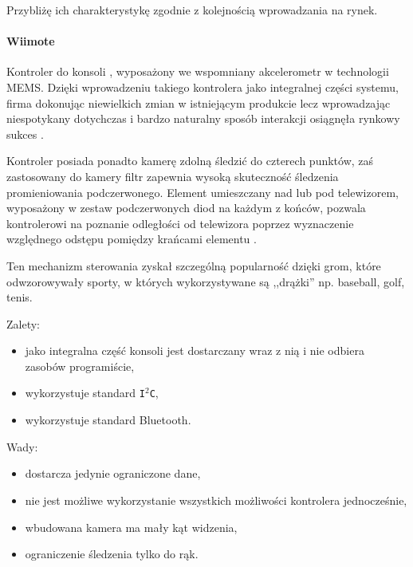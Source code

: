 Przybliżę ich charakterystykę zgodnie z kolejnością wprowadzania na rynek.

\paragraph{Wiimote}
Kontroler do konsoli , wyposażony we wspomniany akcelerometr w technologii MEMS. Dzięki wprowadzeniu takiego kontrolera jako integralnej części systemu, firma  dokonując  niewielkich zmian w istniejącym produkcie \ppauza {} \ppauza lecz wprowadzając niespotykany dotychczas i bardzo naturalny sposób interakcji osiągnęła rynkowy sukces \citep{WiiSales}.

Kontroler posiada ponadto kamerę zdolną śledzić do czterech punktów, zaś zastosowany do kamery filtr zapewnia wysoką skuteczność śledzenia promieniowania podczerwonego. Element  umieszczany nad lub pod telewizorem, wyposażony w zestaw podczerwonych diod na każdym z końców, pozwala kontrolerowi na poznanie odległości od telewizora poprzez wyznaczenie względnego odstępu pomiędzy krańcami elementu .

Ten mechanizm sterowania zyskał szczególną popularność dzięki grom, które odwzorowywały sporty, w których wykorzystywane są ,,drążki'' \ppauza np. baseball, golf, tenis.

Zalety:
\begin{itemize}
  \item jako integralna część konsoli jest dostarczany wraz z nią i nie odbiera zasobów programiście,
  \item wykorzystuje standard \texttt{I$^2$C},
  \item wykorzystuje standard Bluetooth.
\end{itemize}

Wady:
\begin{itemize}
  \item dostarcza jedynie ograniczone dane,
  \item nie jest możliwe wykorzystanie wszystkich możliwości kontrolera jednocześnie,
  \item wbudowana kamera ma mały kąt widzenia,
  \item ograniczenie śledzenia tylko do rąk.
\end{itemize}

